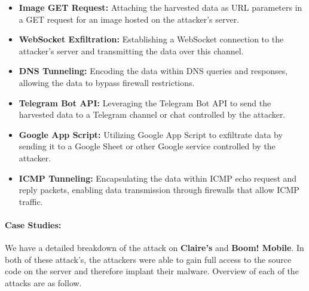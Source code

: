 \begin{itemize}
\item \textbf{Image GET Request:} Attaching the harvested data as URL parameters in a GET request for an image hosted on the attacker's server.
\item \textbf{WebSocket Exfiltration:} Establishing a WebSocket connection to the attacker's server and transmitting the data over this channel.
\item \textbf{DNS Tunneling:} Encoding the data within DNS queries and responses, allowing the data to bypass firewall restrictions.
\item \textbf{Telegram Bot API:} Leveraging the Telegram Bot API to send the harvested data to a Telegram channel or chat controlled by the attacker.
\item \textbf{Google App Script:} Utilizing Google App Script to exfiltrate data by sending it to a Google Sheet or other Google service controlled by the attacker.
\item \textbf{ICMP Tunneling:} Encapsulating the data within ICMP echo request and reply packets, enabling data transmission through firewalls that allow ICMP traffic.
\end{itemize}

\paragraph{Case Studies:} We have a detailed breakdown of the attack on \textbf{Claire's} and \textbf{Boom! Mobile}. In both of these attack's, the attackers were able to gain full access to the source code on the server and therefore implant their malware. Overview of each of the attacks are as follow.

